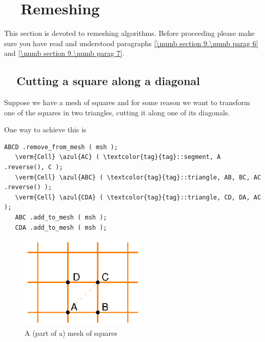 
\chapter{~~Remeshing}\label{\numb section 10}

This section is devoted to remeshing algorithms.
Before proceeding please make sure you have read and understood paragraphs
\ref{\numb section 9.\numb parag 6} and \ref{\numb section 9.\numb parag 7}.


\section{~~Cutting a square along a diagonal}\label{\numb section 10.\numb parag 1}

Suppose we have a mesh of squares and for some reason we want to transform one of the
squares in two triangles, cutting it along one of its diagonals.

One way to achieve this is

\begin{Verbatim}[commandchars=\\\{\},formatcom=\small\tt,frame=single,
   label=parag-\ref{\numb section 10.\numb parag 1}.cpp,rulecolor=\color{coment},
   baselinestretch=0.94,framesep=2mm]
   ABCD .remove_from_mesh ( msh );
   \verm{Cell} \azul{AC} ( \textcolor{tag}{tag}::segment, A .reverse(), C );
   \verm{Cell} \azul{ABC} ( \textcolor{tag}{tag}::triangle, AB, BC, AC .reverse() );
   \verm{Cell} \azul{CDA} ( \textcolor{tag}{tag}::triangle, CD, DA, AC );
   ABC .add_to_mesh ( msh );
   CDA .add_to_mesh ( msh );
\end{Verbatim}

\begin{figure}[ht] \centering
  \includegraphics[width=60mm]{malha-quadr}
  \caption{A (part of a) mesh of squares}
  \label{\numb section 10.\numb fig 1}
\end{figure}


